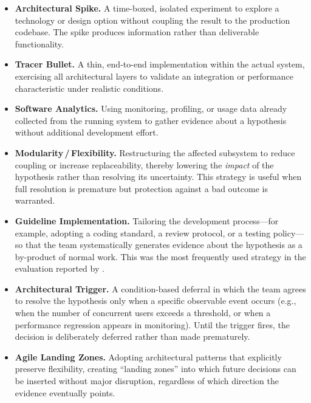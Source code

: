 \begin{itemize}
  \item \textbf{Architectural Spike.} A time-boxed, isolated experiment to explore a
  technology or design option without coupling the result to the production codebase.
  The spike produces information rather than deliverable functionality.

  \item \textbf{Tracer Bullet.} A thin, end-to-end implementation within the actual
  system, exercising all architectural layers to validate an integration or performance
  characteristic under realistic conditions.

  \item \textbf{Software Analytics.} Using monitoring, profiling, or usage data already
  collected from the running system to gather evidence about a hypothesis without
  additional development effort.

  \item \textbf{Modularity\,/\,Flexibility.} Restructuring the affected subsystem to
  reduce coupling or increase replaceability, thereby lowering the \emph{impact} of the
  hypothesis rather than resolving its uncertainty. This strategy is useful when full
  resolution is premature but protection against a bad outcome is warranted.

  \item \textbf{Guideline Implementation.} Tailoring the development process—for
  example, adopting a coding standard, a review protocol, or a testing policy—so that
  the team systematically generates evidence about the hypothesis as a by-product of
  normal work. This was the most frequently used strategy in the evaluation reported by \citet{silva2024tse}.

  \item \textbf{Architectural Trigger.} A condition-based deferral in which the team
  agrees to resolve the hypothesis only when a specific observable event occurs
  (e.g., when the number of concurrent users exceeds a threshold, or when a performance
  regression appears in monitoring). Until the trigger fires, the decision is
  deliberately deferred rather than made prematurely.

  \item \textbf{Agile Landing Zones.} Adopting architectural patterns that explicitly
  preserve flexibility, creating ``landing zones'' into which future decisions can be
  inserted without major disruption, regardless of which direction the evidence
  eventually points.
\end{itemize}

